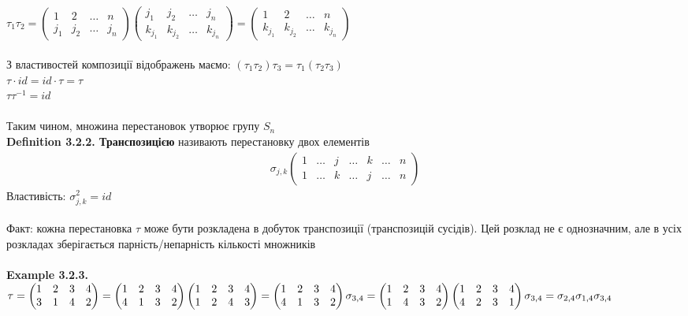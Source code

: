 \documentclass[a4paper, 14pt]{extarticle}
\def\defin#1{\textbf{Definition {#1}}}
\def\ex#1{\textbf{Example {#1}}}
\def\bigline{\vspace{5mm}\\}
\begin{document}
	$\tau_1 \tau_2 = \begin{pmatrix}
	1 & 2 & \dots & n \\
	j_1 & j_2 & \dots & j_n
	\end{pmatrix} \begin{pmatrix}
	j_1 & j_2 & \dots & j_n \\
	k_{j_1} & k_{j_2} & \dots & k_{j_n}
	\end{pmatrix} = \begin{pmatrix}
	1 & 2 & \dots & n \\
	k_{j_1} & k_{j_2} & \dots & k_{j_n}
	\end{pmatrix}$\\
	\\
	З властивостей композиції відображень маємо: $(\tau_1 \tau_2) \tau_3 = \tau_1 (\tau_2 \tau_3)$\\
	$\tau \cdot id = id \cdot \tau = \tau$\\
	$\tau \tau^{-1} = id$\\
	\\
	Таким чином, множина перестановок утворює групу $S_n$
	\bigline
	\defin{3.2.2. Транспозицією} називають перестановку двох елементів
	\begin{align*}
	\sigma_{j,k} \begin{pmatrix}
	1 & \dots & j & \dots & k & \dots & n \\
	1 & \dots & k & \dots & j & \dots & n
	\end{pmatrix}
	\end{align*}
	Властивість: $\sigma_{j,k}^2 = id$\\
	\\
	Факт: кожна перестановка $\tau$ може бути розкладена в добуток транспозиції (транспозицій сусідів). Цей розклад не є однозначним, але в усіх розкладах зберігається парність/непарність кількості множників\\
	\\
	\ex{3.2.3.} $\tau = \begin{pmatrix}
	1 & 2 & 3 & 4 \\
	3 & 1 & 4 & 2
	\end{pmatrix} = \begin{pmatrix}
	1 & 2 & 3 & 4 \\
	4 & 1 & 3 & 2
	\end{pmatrix} \begin{pmatrix}
	1 & 2 & 3 & 4 \\
	1 & 2 & 4 & 3
	\end{pmatrix} = \begin{pmatrix}
	1 & 2 & 3 & 4 \\
	4 & 1 & 3 & 2
	\end{pmatrix} \sigma_{3,4} \\ = \begin{pmatrix}
	1 & 2 & 3 & 4 \\
	1 & 4 & 3 & 2
	\end{pmatrix} \begin{pmatrix}
	1 & 2 & 3 & 4 \\
	4 & 2 & 3 & 1
	\end{pmatrix} \sigma_{3,4} = \sigma_{2,4}\sigma_{1,4}\sigma_{3,4}$
\end{document}
